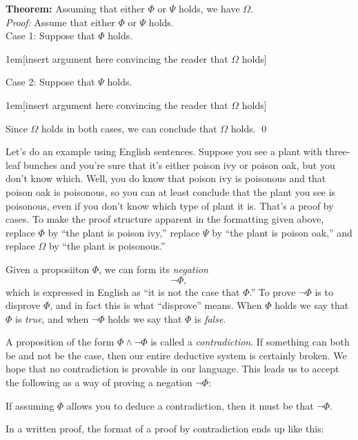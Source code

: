 \documentclass[12pt]{article}
\newcommand{\AND}{\wedge}
\newcommand{\indented}[1]{\begin{adjustwidth}{1em}{}#1\end{adjustwidth}}
\newcommand{\THM}[2]{\textbf{Theorem:} #1\\[0.5em]\textit{Proof:} #2\qed}
\newcommand{\RULE}[2]{\begin{tcolorbox}[title=#1,colbacktitle=white,coltitle=black,colback=white]#2\end{tcolorbox}}
\def\pA{\Phi}
\def\pB{\Psi}
\def\pC{\Omega}
\begin{document}
\THM{Assuming that either $\pA$ or $\pB$ holds, we have $\pC$.}{
Assume that either $\pA$ or $\pB$ holds.\\
Case 1: Suppose that $\pA$ holds.
\indented{[insert argument here convincing the reader that $\pC$ holds]}
Case 2: Suppose that $\pB$ holds.
\indented{[insert argument here convincing the reader that $\pC$ holds]}
Since $\pC$ holds in both cases, we can conclude that $\pC$ holds.
}

Let's do an example using English sentences.
Suppose you see a plant with three-leaf bunches and you're sure that it's either poison ivy or poison oak, but you don't know which.
Well, you do know that poison ivy is poisonous and that poison oak is poisonous, so you can at least conclude that the plant you see is poisonous, even
if you don't know which type of plant it is.
That's a proof by cases.
To make the proof structure apparent in
the formatting given above, replace $\pA$ by ``the plant is poison ivy,'' replace $\pB$ by ``the plant is poison oak,'' and replace $\pC$ by ``the plant is poisonous.''


Given a proposiiton $\pA$, we can form its \emph{negation}
$$
\neg \pA,
$$
which is expressed in English as ``it is not the case that $\pA$.''
To prove $\neg\pA$ is to disprove $\pA$, and in fact this is what ``disprove'' means.
When $\pA$ holds we say that $\pA$ is \emph{true}, and when $\neg\pA$ holds we say that $\pA$ is \emph{false}.

A proposition of the form $\pA\AND\neg\pA$ is called a \emph{contradiction}.
If something can both be and not be the case, then our entire deductive system is certainly broken.
We hope that no contradiction is provable in our language.
This leads us to accept the following as a way of proving a negation $\neg\pA$:
\RULE{Proof by contradiction}{
If assuming $\pA$ allows you to deduce a contradiction, then it must be that $\neg\pA$.
}
In a written proof, the format of a proof by contradiction ends up like this:
\end{document}
